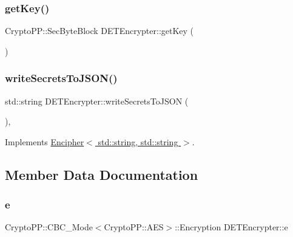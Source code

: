 \subsubsection{\texorpdfstring{get\+Key()}{getKey()}}
{\footnotesize\ttfamily Crypto\+P\+P\+::\+Sec\+Byte\+Block D\+E\+T\+Encrypter\+::get\+Key (\begin{DoxyParamCaption}{ }\end{DoxyParamCaption})}

\mbox{\label{classDETEncrypter_a30ffe8f94a95f723e62d0b1a1ed8dc56}} 
\subsubsection{\texorpdfstring{write\+Secrets\+To\+J\+S\+O\+N()}{writeSecretsToJSON()}}
{\footnotesize\ttfamily std\+::string D\+E\+T\+Encrypter\+::write\+Secrets\+To\+J\+S\+ON (\begin{DoxyParamCaption}{ }\end{DoxyParamCaption})\hspace{0.3cm}{\ttfamily [override]}, {\ttfamily [virtual]}}



Implements \hyperlink{classEncipher_a27d3efa1e364c1f0d7def65454c61b85}{Encipher$<$ std\+::string, std\+::string $>$}.



\subsection{Member Data Documentation}
\mbox{\label{classDETEncrypter_a29875af9a8c1df01802d11f0a00f5f90}} 
\subsubsection{\texorpdfstring{e}{e}}
{\footnotesize\ttfamily Crypto\+P\+P\+::\+C\+B\+C\+\_\+\+Mode$<$Crypto\+P\+P\+::\+A\+ES$>$\+::Encryption D\+E\+T\+Encrypter\+::e\hspace{0.3cm}{\ttfamily [private]}}

\mbox{\label{classDETEncrypter_a40e99abf751fa9c802b3a4cc9c6796a0}} 
